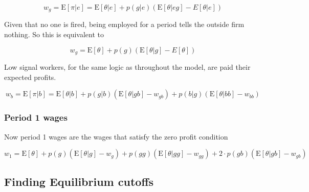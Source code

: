 \documentclass[11pt]{article}
\newcommand{\E}{\mathrm{E}}
\begin{document}
$$ w_g = \E[\pi|e] = \E[\theta|e] + p(g|e)(\E[\theta|eg] - E[\theta|e])$$

Given that no one is fired, being employed for a period tells the outside firm nothing. So this is equivalent to 

$$ w_g = \E[\theta] + p(g)(\E[\theta|g] - E[\theta]) $$

Low signal workers, for the same logic as throughout the model, are paid their expected profits. 

$$ w_b = \E[\pi|b] = \E[\theta|b] + p(g|b)(\E[\theta|gb] - w_{gb}) + p(b|g)(\E[\theta|bb] - w_{bb


})$$


\subsubsection{Period 1 wages }

Now period 1 wages are the wages that satisfy the zero profit condition 

$$w_1 = \E[\theta] + p(g) (\E[\theta|g] - w_g) + p(gg)(\E[\theta|gg] - w_{gg}) + 2\cdot p(gb)(\E[\theta|gb] - w_{gb})$$


\subsection{Finding Equilibrium cutoffs}





	
\end{document}
